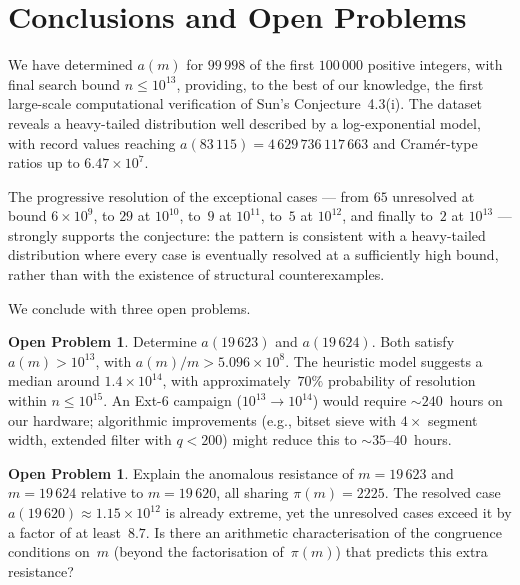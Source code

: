 \documentclass{amsart}
\theoremstyle{definition}
\newtheorem{openproblem}[theorem]{Open Problem}
\theoremstyle{remark}
\numberwithin{equation}{section}
\begin{document}
\section{Conclusions and Open Problems}
\label{sec:conclusions}

We have determined $a(m)$ for $99\,998$ of the first $100\,000$
positive integers, with final search bound $n \le 10^{13}$,
providing, to the best of our knowledge, the first large-scale
computational verification of Sun's Conjecture~4.3(i).
The dataset reveals a heavy-tailed distribution
well described by a log-exponential model, with record values
reaching $a(83\,115) = 4\,629\,736\,117\,663$ and
Cram\'er-type ratios up to $6.47 \times 10^7$.

The progressive resolution of the exceptional cases --- from $65$
unresolved at bound $6 \times 10^9$, to $29$ at $10^{10}$, to~$9$
at $10^{11}$, to~$5$ at $10^{12}$, and finally to~$2$ at
$10^{13}$ --- strongly supports the conjecture: the pattern is
consistent with a heavy-tailed distribution where
every case is eventually resolved at a sufficiently high bound,
rather than with the existence of structural counterexamples.

We conclude with three open problems.

\begin{openproblem}\label{op:unresolved}
Determine $a(19\,623)$ and $a(19\,624)$.  Both satisfy
$a(m) > 10^{13}$, with $a(m)/m > 5.096 \times 10^8$.
The heuristic model suggests a median around
$1.4 \times 10^{14}$, with approximately~$70\%$ probability
of resolution within $n \le 10^{15}$.
An Ext-6 campaign ($10^{13} \to 10^{14}$) would require
$\sim 240$~hours on our hardware; algorithmic improvements
(e.g., bitset sieve with $4\times$ segment width,
extended filter with $q < 200$) might reduce this to
$\sim 35$--$40$~hours.
\end{openproblem}

\begin{openproblem}\label{op:cluster}
Explain the anomalous resistance of $m = 19\,623$ and
$m = 19\,624$ relative to $m = 19\,620$, all sharing
$\pi(m) = 2225$.  The resolved case $a(19\,620) \approx
1.15 \times 10^{12}$ is already extreme, yet the unresolved
cases exceed it by a factor of at least~$8.7$.
Is there an arithmetic characterisation of the congruence
conditions on~$m$ (beyond the factorisation of~$\pi(m)$) that
predicts this extra resistance?
\end{openproblem}
\end{document}
